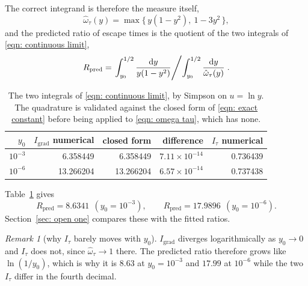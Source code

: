 \documentclass[11pt,a4paper]{article}
\theoremstyle{definition}
\theoremstyle{remark}
\newtheorem{remark}{Remark}
\begin{document}
The correct integrand is therefore the measure itself,
\begin{equation}
  \hat\omega_\tau(y) = \max\bigl\{\,y(1-y^2),\ 1-3y^2\,\bigr\},
  \label{eqn: omega tau}
\end{equation}
and the predicted ratio of escape times is the quotient of the two integrals of
\eqref{eqn: continuous limit},
\begin{equation}
  R_{\mathrm{pred}}
    = \left.\int_{y_0}^{1/2}\frac{\mathrm{d}y}{y(1-y^2)}
      \middle/
      \int_{y_0}^{1/2}\frac{\mathrm{d}y}{\hat\omega_\tau(y)}\right. .
  \label{eqn: ratio pred}
\end{equation}

\begin{table}[H]
  \centering\small
  \caption{The two integrals of \eqref{eqn: continuous limit}, by Simpson on
    $u = \ln y$. The quadrature is validated against the closed form of
    \eqref{eqn: exact constant} before being applied to
    \eqref{eqn: omega tau}, which has none.}
  \label{tab: integrals}
  \begin{tabular}{rrrrr}
    \toprule
    $y_0$ & $I_{\mathrm{grad}}$ numerical & closed form & difference
      & $I_\tau$ numerical \\
    \midrule
    $10^{-3}$ &  6.358449 &  6.358449 & $7.11\times10^{-14}$ & 0.736439 \\
    $10^{-6}$ & 13.266204 & 13.266204 & $6.57\times10^{-14}$ & 0.737438 \\
    \bottomrule
  \end{tabular}
\end{table}

Table~\ref{tab: integrals} gives
\begin{equation}
  R_{\mathrm{pred}} = 8.6341 \ \ (y_0 = 10^{-3}),
  \qquad
  R_{\mathrm{pred}} = 17.9896 \ \ (y_0 = 10^{-6}).
  \label{eqn: ratio values}
\end{equation}
Section~\ref{sec: open one} compares these with the fitted ratios.

\begin{remark}[why $I_\tau$ barely moves with $y_0$]
  $I_{\mathrm{grad}}$ diverges logarithmically as $y_0 \to 0$ and $I_\tau$ does
  not, since $\hat\omega_\tau \to 1$ there. The predicted ratio therefore grows
  like $\ln(1/y_0)$, which is why it is $8.63$ at $y_0 = 10^{-3}$ and $17.99$ at
  $10^{-6}$ while the two $I_\tau$ differ in the fourth decimal.
\end{remark}

\end{document}

